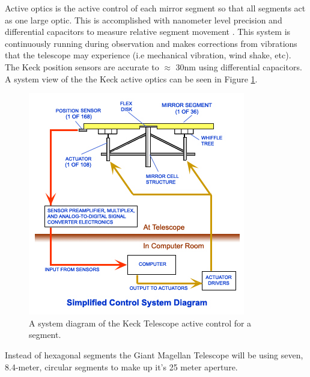 Active optics is the active control of each mirror segment so that all segments act as one large optic.  This is accomplished with nanometer level precision and differential capacitors to measure relative segment movement \cite{Nelson1990titleConstructionObservatory/title}.  This system is continuously running during observation and makes corrections from vibrations that the telescope may experience (i.e mechanical vibration, wind shake, etc).  The Keck position sensors are accurate to $\approx$ 30nm using differential capacitors.  A system view of the the Keck active optics can be seen in Figure \ref{fig:active_control}.


\begin{figure}[H]
\centering
\includegraphics[width=12 cm]{../Figures/KCompDiag}
\caption{A system diagram of the Keck Telescope active control for a segment.}
\label{fig:active_control}
\end{figure}

Instead of hexagonal segments the Giant Magellan Telescope will be using seven, 8.4-meter, circular segments to make up it's 25 meter aperture.  


